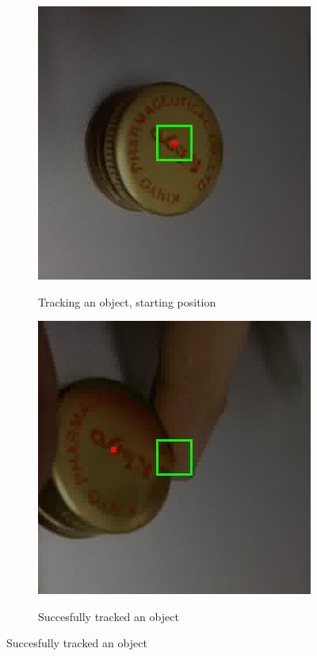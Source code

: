 \begin{figure}[t]
\begin{subfigure}[b]{.45\linewidth}
	 \end{subfigure}%

 \begin{subfigure}[c]{.45\linewidth}
	   \includegraphics[width=0.9\linewidth]{track1}
           \label{tracking1}
           \caption{Tracking an object, starting position}
 \end{subfigure}%
\hspace{.01\linewidth}
\begin{subfigure}[c]{.45\linewidth}
    \includegraphics[width=0.9\linewidth]{track2}
    \label{tracking2} 
   \caption{Succesfully tracked an object}
\end{subfigure}%


\end{figure}
